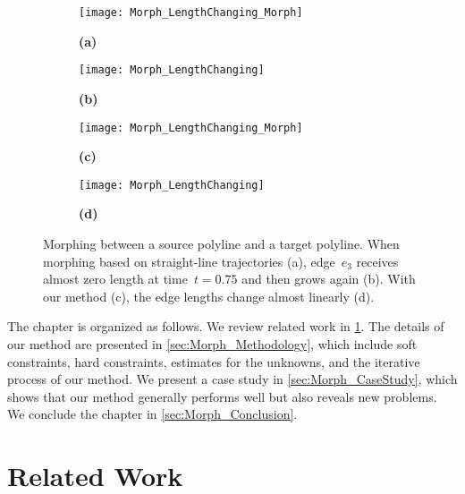 \begin{figure}[tb]
\begin{subfigure}[b]{.49\textwidth}
	\centering
	\texttt{[image: Morph\_LengthChanging\_Morph]}
	\caption{\textbf{(a)}}
\end{subfigure}
\hfill
\begin{subfigure}[b]{.49\textwidth}
	\centering
	\texttt{[image: Morph\_LengthChanging]}
	\caption{\textbf{(b)}}
\end{subfigure}

\bigskip
\begin{subfigure}[b]{.49\textwidth}
\centering
\texttt{[image: Morph\_LengthChanging\_Morph]}
\caption{\textbf{(c)}}
\end{subfigure}
\hfill
\begin{subfigure}[b]{.49\textwidth}
	\centering
	\texttt{[image: Morph\_LengthChanging]}
	\caption{\textbf{(d)}}
\end{subfigure}
	\caption{Morphing between 
		a source polyline and a target polyline.
		When morphing based on straight-line trajectories (a), 
		edge~$e_3$ receives almost zero length 
		at time~$t=0.75$ and then grows again (b). 
		With our method (c), 
		the edge lengths change almost linearly (d).}
	\label{fig:Morph_LengthChanging}
\end{figure}

The chapter is organized as follows. 
We review related work in 
\sect\ref{sec:Morph_RelatedWork}. 
The details of our method are presented in 
\sect\ref{sec:Morph_Methodology}, 
which include soft constraints, hard constraints, 
estimates for the unknowns, 
and the iterative process of our method. 
We present a case study in 
\sect\ref{sec:Morph_CaseStudy}, 
which shows that our 
method generally performs well but also reveals new problems. 
We conclude the chapter in 
\sect\ref{sec:Morph_Conclusion}.

\section{Related Work}
\label{sec:Morph_RelatedWork}

